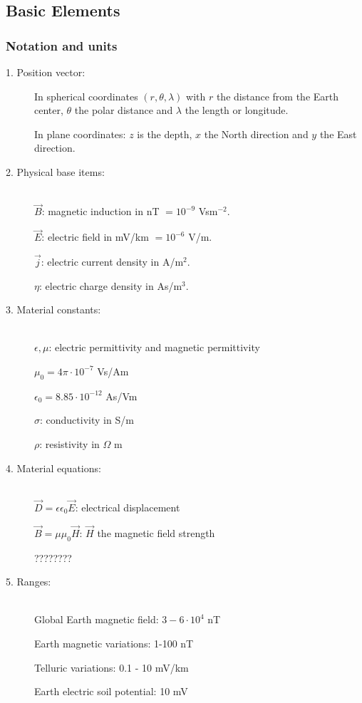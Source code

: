 \subsection{Basic Elements}
\subsubsection{Notation and units}
\begin{description}
\item[1. Position vector:] In spherical coordinates $(r,\theta,\lambda)$ with $r$ the distance from the Earth center, $\theta$ the polar distance and $\lambda$ the length or longitude.

In plane coordinates: $z$ is the depth, $x$ the North direction and $y$ the East direction.

\item[2. Physical base items:]~\\
$\vec{B}$: magnetic induction in nT $=10^{-9}$ Vsm$^{-2}$. 

$\vec{E}$: electric field in mV/km $=10^{-6}$ V/m.

$\vec{j}$: electric current density in A/m$^2$.

$\eta$: electric charge density in As/m$^3$.


\item[3. Material constants:] ~\\
$\epsilon,\mu$: electric permittivity and magnetic permittivity

$\mu_0=4\pi\cdot 10^{-7}$ Vs/Am

$\epsilon_0=8.85\cdot 10^{-12}$ As/Vm

$\sigma$: conductivity in S/m

$\rho$: resistivity in $\Omega$ m

\item[4. Material equations:]~\\

$\vec{D}=\epsilon\epsilon_0\vec{E}$: electrical displacement

$\vec{B}=\mu\mu_0\vec{H}$: $\vec{H}$ the magnetic field strength

????????

\item[5. Ranges:]~\\

Global Earth magnetic field: $3-6\cdot 10^4$ nT 

Earth magnetic variations: 1-100 nT

Telluric variations: 0.1 - 10 mV/km

Earth electric soil potential: 10 mV
\end{description}

